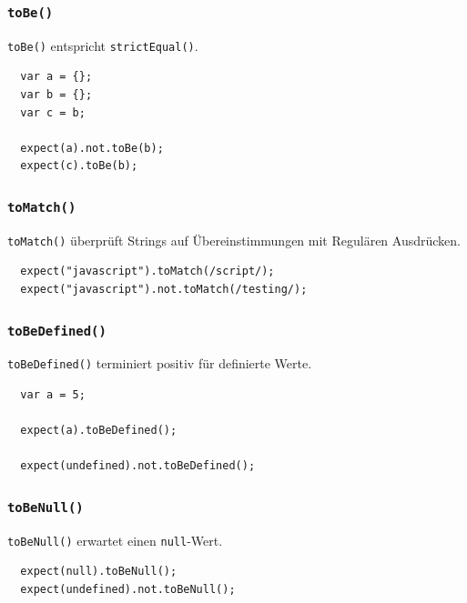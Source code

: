 \documentclass[11pt, a4paper]{article}
\begin{document}
\subsubsection*{\texttt{toBe()}}

\texttt{toBe()} entspricht \texttt{strictEqual()}.

\begin{verbatim}
  var a = {};
  var b = {};
  var c = b;

  expect(a).not.toBe(b);
  expect(c).toBe(b);
\end{verbatim}

\clearpage

\subsubsection*{\texttt{toMatch()}}

\texttt{toMatch()} überprüft Strings auf Übereinstimmungen mit Regulären
Ausdrücken.

\begin{verbatim}
  expect("javascript").toMatch(/script/);
  expect("javascript").not.toMatch(/testing/);
\end{verbatim}

\subsubsection*{\texttt{toBeDefined()}}

\texttt{toBeDefined()} terminiert positiv für definierte Werte.

\begin{verbatim}
  var a = 5;

  expect(a).toBeDefined();

  expect(undefined).not.toBeDefined();
\end{verbatim}

\subsubsection*{\texttt{toBeNull()}}

\texttt{toBeNull()} erwartet einen \texttt{null}-Wert.

\begin{verbatim}
  expect(null).toBeNull();
  expect(undefined).not.toBeNull();
\end{verbatim}
\end{document}
